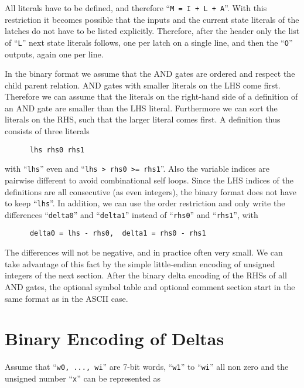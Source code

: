 \documentclass{llncs}
\begin{document}
  All literals have to be defined, and therefore ``\texttt{M = I + L + A}''.  With this
  restriction it becomes possible that the inputs and the current state
  literals of the latches do not have to be listed explicitly.  Therefore,
  after the header only the list of ``\texttt{L}'' next state literals follows, one per
  latch on a single line, and then the ``\texttt{O}'' outputs, again one per line.

  In the binary format we assume that the AND gates are ordered and respect
  the child parent relation.  AND gates with smaller literals on the LHS
  come first.  Therefore we can assume that the literals on the right-hand
  side of a definition of an AND gate are smaller than the LHS literal.
  Furthermore we can sort the literals on the RHS, such that the larger
  literal comes first.  A definition thus consists of three literals
    
\begin{verbatim}
      lhs rhs0 rhs1
\end{verbatim}

  with ``\texttt{lhs}'' even and ``\texttt{lhs > rhs0 >= rhs1}''.  Also the variable indices are
  pairwise different to avoid combinational self loops.  Since the LHS
  indices of the definitions are all consecutive (as even integers),
  the binary format does not have to keep ``\texttt{lhs}''.  In addition, we can use
  the order restriction and only write the differences ``\texttt{delta0}'' and
  ``\texttt{delta1}''
  instead of ``\texttt{rhs0}'' and ``\texttt{rhs1}'', with

\begin{verbatim}
      delta0 = lhs - rhs0,  delta1 = rhs0 - rhs1
\end{verbatim}
  
  The differences will not be negative, and in practice often very small.
  We can take advantage of this fact by the simple little-endian encoding of
  unsigned integers of the next section.  After the binary delta encoding of
  the RHSs of all AND gates, the optional symbol table and optional comment
  section start in the same format as in the ASCII case.

\section{Binary Encoding of Deltas}
  
  Assume that ``\texttt{w0, ..., wi}'' are 7-bit words, ``\texttt{w1}'' to
  ``\texttt{wi}'' all non zero and
  the unsigned number ``\texttt{x}'' can be represented as
    
\end{document}
